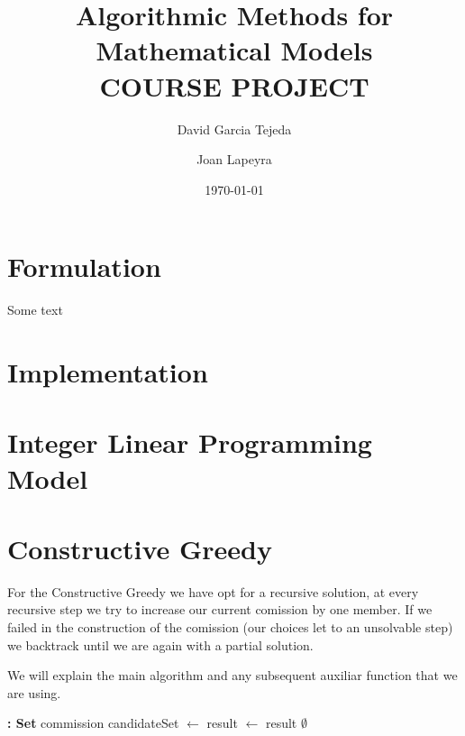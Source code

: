 \documentclass{article}
\title{%
  Algorithmic Methods for Mathematical Models\\
  \large COURSE PROJECT }
\author{David Garcia Tejeda \and Joan Lapeyra}
\date{\today}
\begin{document}
\maketitle

\section{Formulation}
Some text
\section{Implementation}
\section{Integer Linear Programming Model}
\section{Constructive Greedy}

For the Constructive Greedy we have opt for a recursive solution, at every recursive step we try to increase our current comission by one member. If we failed in the construction of the comission (our choices let to an unsolvable step) we backtrack until we are again with a partial solution.

We will explain the main algorithm and any subsequent auxiliar function that we are using.

\begin{algorithmic}[H]
 \textbf{: Set}
        \State \Return commission
    \EndIf
    \State candidateSet $\gets$ 
        \State result $\gets$ 
            \State \Return result
        \EndIf
    \EndFor
    \State \Return $\emptyset$
\EndFunction
\end{algorithmic}
\end{document}
